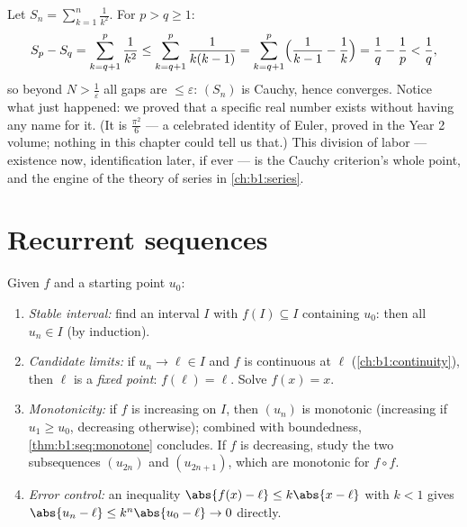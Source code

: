 \begin{example}\label{ex:b1:seq:basel}
Let $S_n = \sum_{k=1}^{n} \frac{1}{k^2}$. For $p > q \geq 1$:
\[
S_p - S_q = \sum_{k=q+1}^{p} \frac{1}{k^2}
\leq \sum_{k=q+1}^{p} \frac{1}{k(k-1)}
= \sum_{k=q+1}^{p} \Bigl(\frac{1}{k-1} - \frac 1k\Bigr)
= \frac 1q - \frac 1p < \frac 1q ,
\]
so beyond $N > \frac1\varepsilon$ all gaps are $\leq \varepsilon$:
$(S_n)$ is Cauchy, hence converges. Notice what just happened: we
proved that a specific real number exists without having any name
for it. (It is $\frac{\pi^2}{6}$ --- a celebrated identity of
Euler, proved in the Year 2 volume; nothing in this chapter could
tell us that.) This division of labor --- existence now,
identification later, if ever --- is the Cauchy criterion's whole
point, and the engine of the theory of series in
\cref{ch:b1:series}.
\end{example}

\section{Recurrent sequences}

\begin{method}[Studying $u_{n+1} = f(u_n)$]\label{met:b1:seq:recurrent}
Given $f$ and a starting point $u_0$:
\begin{enumerate}
  \item \emph{Stable interval:} find an interval $I$ with $f(I)
        \subseteq I$ containing $u_0$: then all $u_n \in I$ (by
        induction).
  \item \emph{Candidate limits:} if $u_n \to \ell \in I$ and $f$ is
        continuous at $\ell$ (\cref{ch:b1:continuity}), then $\ell$
        is a \emph{fixed point}: $f(\ell) = \ell$. Solve $f(x) = x$.
  \item \emph{Monotonicity:} if $f$ is increasing on $I$, then
        $(u_n)$ is monotonic (increasing if $u_1 \geq u_0$,
        decreasing otherwise); combined with boundedness,
        \cref{thm:b1:seq:monotone} concludes. If $f$ is decreasing,
        study the two subsequences $(u_{2n})$ and $(u_{2n+1})$,
        which are monotonic for $f \circ f$.
  \item \emph{Error control:} an inequality $\abs{f(x) - \ell} \leq
        k\abs{x - \ell}$ with $k < 1$ gives $\abs{u_n - \ell} \leq
        k^n \abs{u_0 - \ell} \to 0$ directly.
\end{enumerate}
\end{method}

